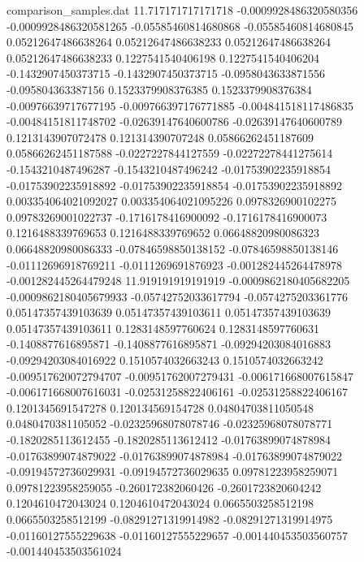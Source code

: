\begin{filecontents}{comparison_samples.dat}
11.717171717171718  -0.0009928486320580356  -0.0009928486320581265  -0.05585460814680868   -0.05585460814680845   0.05212647486638264    0.05212647486638233    0.05212647486638264    0.05212647486638233    0.1227541540406198     0.1227541540406204     -0.1432907450373715     -0.1432907450373715     -0.0958043633871556    -0.095804363387156     0.1523379908376385      0.1523379908376384      -0.00976639717677195    -0.009766397176771885   -0.004841518117486835   -0.00484151811748702    -0.02639147640600786    -0.02639147640600789    0.1213143907072478      0.121314390707248       0.05866262451187609     0.05866262451187588     -0.0227227844127559    -0.02272278441275614   -0.1543210487496287    -0.1543210487496242    -0.01753902235918854    -0.01753902235918892    -0.01753902235918854    -0.01753902235918892    0.003354064021092027   0.003354064021095226   0.0978326900102275      0.09783269001022737     -0.1716178416900092    -0.1716178416900073    0.1216488339769653      0.1216488339769652      0.06648820980086323     0.06648820980086333     -0.07846598850138152   -0.07846598850138146   -0.01112696918769211   -0.0111269691876923    -0.001282445264478978   -0.001282445264479248 
11.919191919191919  -0.0009862180405682205  -0.0009862180405679933  -0.05742752033617794   -0.0574275203361776    0.05147357439103639    0.05147357439103611    0.05147357439103639    0.05147357439103611    0.1283148597760624     0.1283148597760631     -0.1408877616895871     -0.1408877616895871     -0.09294203084016883   -0.09294203084016922   0.1510574032663243      0.1510574032663242      -0.009517620072794707   -0.00951762007279431    -0.006171668007615847   -0.006171668007616031   -0.02531258822406161    -0.02531258822406167    0.1201345691547278      0.120134569154728       0.04804703811050548     0.0480470381105052      -0.02325968078078746   -0.02325968078078771   -0.1820285113612455    -0.1820285113612412    -0.01763899074878984    -0.01763899074879022    -0.01763899074878984    -0.01763899074879022    -0.09194572736029931   -0.09194572736029635   0.09781223958259071     0.09781223958259055     -0.260172382060426     -0.2601723820604242    0.1204610472043024      0.1204610472043024      0.0665503258512198      0.0665503258512199      -0.08291271319914982   -0.08291271319914975   -0.01160127555229638   -0.01160127555229657   -0.001440453503560757   -0.001440453503561024 

\end{filecontents}
